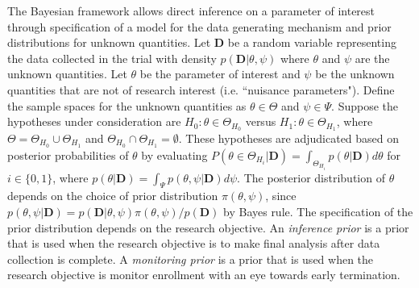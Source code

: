 \documentclass[12pt]{article}
\begin{document}
The Bayesian framework allows direct inference on a parameter of interest through specification of a model for the data generating mechanism and prior distributions for unknown quantities. Let $\mathbf{D}$ be a random variable representing the data collected in the trial with density $p(\mathbf{D}|\theta,\psi)$ where $\theta$ and $\psi$ are the unknown quantities. Let $\theta$ be the parameter of interest and $\psi$ be the unknown quantities that are not of research interest (i.e. ``nuisance parameters"). Define the sample spaces for the unknown quantities as $\theta\in\Theta$ and $\psi\in\Psi$. Suppose the hypotheses under consideration are $H_0:\theta\in\Theta_{H_0}$ versus $H_1:\theta\in\Theta_{H_1}$, where $\Theta=\Theta_{H_0}\cup \Theta_{H_1}$ and $\Theta_{H_0}\cap \Theta_{H_1}=\emptyset$. These hypotheses are adjudicated based on posterior probabilities of $\theta$ by evaluating $P(\theta\in\Theta_{H_i}|\mathbf{D})=\int_{\Theta_{H_i}}p(\theta|\mathbf{D})d\theta$ for $i\in\{0,1\}$, where $p(\theta|\mathbf{D})=\int_{\Psi}p(\theta,\psi|\mathbf{D})d\psi$. The posterior distribution of $\theta$ depends on the choice of prior distribution $\pi(\theta,\psi)$, since $p(\theta,\psi|\mathbf{D})=p(\mathbf{D}|\theta,\psi)\pi(\theta,\psi)/p(\mathbf{D})$ by Bayes rule. The specification of the prior distribution depends on the research objective. An \textit{inference prior} is a prior that is used when the research objective is to make final analysis after data collection is complete. A \textit{monitoring prior} is a prior that is used when the research objective is monitor enrollment with an eye towards early termination.
\end{document}
